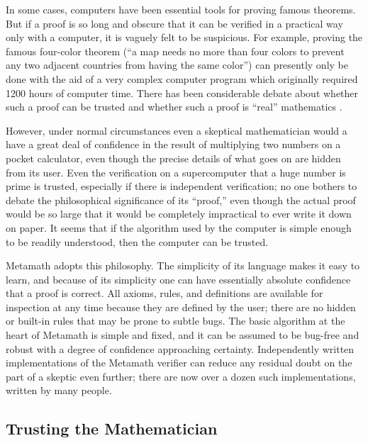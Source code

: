 In some cases, computers have been essential tools for proving famous
theorems.  But if a proof is so long and obscure that it can be verified in a
practical way only with a computer, it is vaguely felt to be suspicious.  For
example, proving the famous four-color theorem (``a map needs no more than four colors to
prevent any two adjacent countries from having the same color'') can presently
only be done with the aid of a very complex computer program which originally
required 1200 hours of computer time. There has been considerable debate about
whether such a proof can be trusted and whether such a proof is ``real''
mathematics \cite{Swart}.

However, under normal circumstances even a skeptical mathematician would a have
a great deal of confidence in the result of multiplying two numbers on a pocket
calculator, even though the precise details of what goes on are hidden from its
user.  Even the verification on a supercomputer that a huge number is prime is
trusted, especially if there is independent verification; no one bothers to
debate the philosophical significance of its ``proof,'' even though the actual
proof would be so large that it would be completely impractical to ever write
it down on paper.  It seems that if the algorithm used by the computer is
simple enough to be readily understood, then the computer can be trusted.

Metamath adopts this philosophy.  The simplicity of its
language makes it easy to learn, and because of its simplicity one can have
essentially absolute confidence that a proof is correct. All axioms, rules, and
definitions are available for inspection at any time because they are defined
by the user; there are no hidden or built-in rules that may be prone to subtle
bugs.  The basic algorithm at the heart of
Metamath is simple and fixed, and it can be assumed to be bug-free and robust
with a degree of confidence approaching certainty.
Independently written implementations of the Metamath verifier
can reduce any residual doubt on the part of a skeptic even further;
there are now over a dozen such implementations, written by many people.

\subsection{Trusting the Mathematician}\label{trust}

